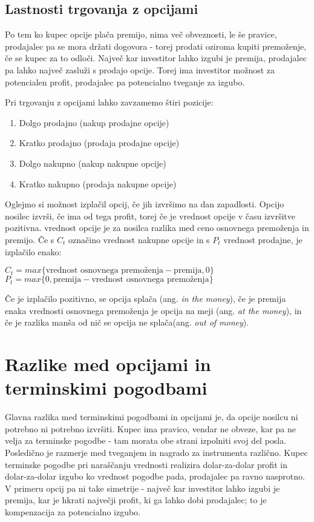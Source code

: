 \documentclass[a4paper]{article}
\begin{document}
\subsection{Lastnosti trgovanja z opcijami}
Po tem ko kupec opcije plača premijo, nima več obveznosti, le še pravice, prodajalec pa se mora držati dogovora - torej prodati
oziroma kupiti premoženje, če se kupec za to odloči. Največ kar investitor lahko izgubi je premija,
prodajalec pa lahko največ zasluži s prodajo opcije. Torej ima investitor možnost za potencialen profit,
prodajalec pa potencialno tveganje za izgubo.

Pri trgovanju z opcijami lahko zavzamemo štiri pozicije:
\begin{enumerate}
    \item Dolgo prodajno (nakup prodajne opcije)
    \item Kratko prodajno (prodaja prodajne opcije)
    \item Dolgo nakupno (nakup nakupne opcije)
    \item Kratko nakupno (prodaja nakupne opcije)
\end{enumerate}
\pagebreak
Oglejmo si možnost izplačil opcij, če jih izvršimo na dan zapadlosti. Opcijo nosilec izvrši, če ima od tega profit, torej
če je vrednost opcije v času izvršitve pozitivna. vrednost opcije je za nosilca razlika med ceno osnovnega premoženja in premijo.
Če s $C_{t}$ označino vrednost nakupne opcije in s $P_{t}$ vrednost prodajne, je izplačilo enako:
\begin{center}
$C_{t} = max\{\text{vrednost osnovnega premoženja} - \text{premija}, 0\}$ \\
$P_{t} = max\{0, \text{premija} - \text{vrednost osnovnega premoženja}\}$
\end{center}
Če je izplačilo pozitivno, se opcija splača (ang. \textit{in the money}), če je premija enaka vrednosti osnovnega premoženja
je opcija na meji (ang. \textit{at the money}), in če je razlika manša od nič se opcija ne splača(ang. \textit{out of money}).

\section{Razlike med opcijami in terminskimi pogodbami}
Glavna razlika med terminskimi pogodbami in opcijami je, da opcije nosilcu ni potrebno ni potrebno izvršiti. Kupec ima pravico,
vendar ne obveze, kar pa ne velja za terminske pogodbe - tam morata obe strani izpolniti svoj del posla.
Posledično je razmerje med tveganjem in nagrado za instrumenta različno. Kupec terminske pogodbe pri naraščanju vrednosti
realizira dolar-za-dolar profit in dolar-za-dolar izgubo ko vrednost pogodbe pada, prodajalec pa ravno nasprotno. V primeru
opcij pa ni take simetrije - največ kar investitor lahko izgubi je premija, kar je hkrati največji profit, ki ga lahko dobi prodajalec;
to je kompenzacija za potencialno izgubo.
\end{document}
